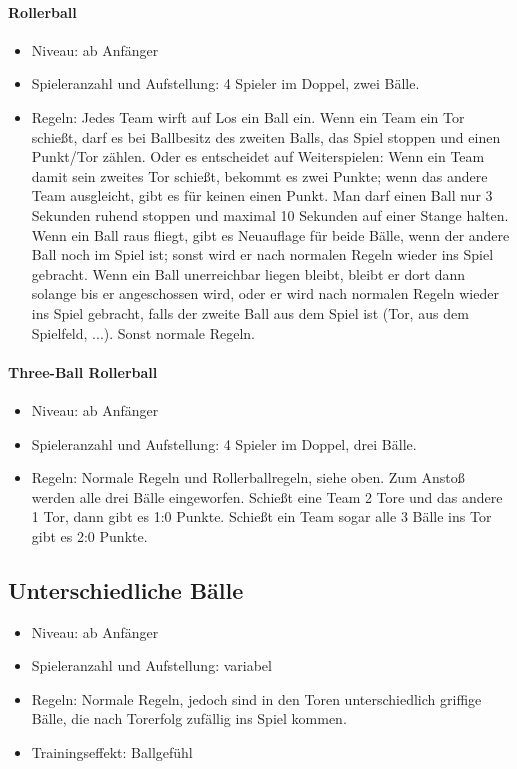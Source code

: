 \paragraph{Rollerball}
\begin{itemize}
\item Niveau: ab Anfänger
\item Spieleranzahl und Aufstellung: 4 Spieler im Doppel, zwei Bälle.
\item Regeln: Jedes Team wirft auf Los ein Ball ein. Wenn ein Team ein Tor schießt, darf es bei Ballbesitz des zweiten Balls, das Spiel stoppen und einen Punkt/Tor zählen. 
Oder es entscheidet auf Weiterspielen: Wenn ein Team damit sein zweites Tor schießt, bekommt es zwei Punkte; 
wenn das andere Team ausgleicht, gibt es für keinen einen Punkt. Man darf einen Ball nur 3 Sekunden ruhend stoppen und maximal 10 Sekunden auf einer Stange halten. 
Wenn ein Ball raus fliegt, gibt es Neuauflage für beide Bälle, wenn der andere Ball noch im Spiel ist; sonst wird er nach normalen Regeln wieder ins Spiel gebracht. 
Wenn ein Ball unerreichbar liegen bleibt, bleibt er dort dann solange bis er angeschossen wird, oder er wird nach normalen Regeln wieder ins Spiel gebracht, falls der zweite Ball aus dem Spiel ist (Tor, aus dem Spielfeld, ...). Sonst normale Regeln.
\end{itemize}


\paragraph{Three-Ball Rollerball}
\begin{itemize}
\item Niveau: ab Anfänger
\item Spieleranzahl und Aufstellung: 4 Spieler im Doppel, drei Bälle.
\item Regeln: Normale Regeln und Rollerballregeln, siehe oben. Zum Anstoß werden alle drei Bälle eingeworfen. 
Schießt eine Team 2 Tore und das andere 1 Tor, dann gibt es 1:0 Punkte. 
Schießt ein Team sogar alle 3 Bälle ins Tor gibt es 2:0 Punkte.
\end{itemize}


\subsection{Unterschiedliche Bälle}
\label{spielformen:sonderregeln:unterschiedlichebaelle}

\begin{itemize}
\item Niveau: ab Anfänger
\item Spieleranzahl und Aufstellung: variabel
\item Regeln: Normale Regeln, jedoch sind in den Toren unterschiedlich griffige Bälle, die nach Torerfolg zufällig ins Spiel kommen.
\item Trainingseffekt: Ballgefühl 
\end{itemize}


